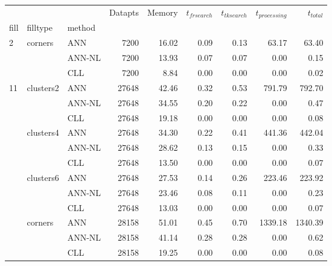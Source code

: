 \begin{tabular}{lllrrrrrr}
\toprule
    &      &     &  Datapts &  Memory &  $t_{frsearch}$ &  $t_{tksearch}$ &  $t_{processing}$ &  $t_{total}$ \\
fill & filltype & method &          &         &                 &                 &                   &              \\
\midrule
2 & corners & ANN &     7200 &   16.02 &            0.09 &            0.13 &             63.17 &        63.40 \\
    &      & ANN-NL &     7200 &   13.93 &            0.07 &            0.07 &              0.00 &         0.15 \\
    &      & CLL &     7200 &    8.84 &            0.00 &            0.00 &              0.00 &         0.02 \\[2.0ex]
11 & clusters2 & ANN &    27648 &   42.46 &            0.32 &            0.53 &            791.79 &       792.70 \\
    &      & ANN-NL &    27648 &   34.55 &            0.20 &            0.22 &              0.00 &         0.47 \\
    &      & CLL &    27648 &   19.18 &            0.00 &            0.00 &              0.00 &         0.08 \\
    & clusters4 & ANN &    27648 &   34.30 &            0.22 &            0.41 &            441.36 &       442.04 \\
    &      & ANN-NL &    27648 &   28.62 &            0.13 &            0.15 &              0.00 &         0.33 \\
    &      & CLL &    27648 &   13.50 &            0.00 &            0.00 &              0.00 &         0.07 \\
    & clusters6 & ANN &    27648 &   27.53 &            0.14 &            0.26 &            223.46 &       223.92 \\
    &      & ANN-NL &    27648 &   23.46 &            0.08 &            0.11 &              0.00 &         0.23 \\
    &      & CLL &    27648 &   13.03 &            0.00 &            0.00 &              0.00 &         0.07 \\
    & corners & ANN &    28158 &   51.01 &            0.45 &            0.70 &           1339.18 &      1340.39 \\
    &      & ANN-NL &    28158 &   41.14 &            0.28 &            0.28 &              0.00 &         0.62 \\
    &      & CLL &    28158 &   19.25 &            0.00 &            0.00 &              0.00 &         0.08 \\

\end{tabular}
